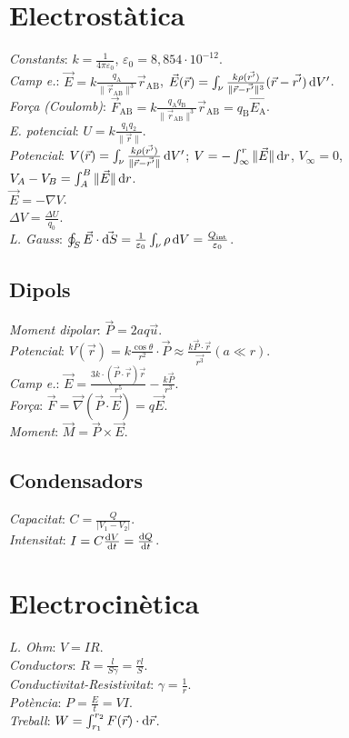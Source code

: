 \section{Electrostàtica} \emph{Constants}: $k=\frac{1}{4\pi\varepsilon_0}$, $\varepsilon_0=8,854\cdot 10^{-12}$. \\ \emph{Camp e.}: $\vec{E} = k\frac{q_\text{A}}{\|\vec{r}_{\text{AB}}\|^3}\vec{r}_{\text{AB}}$, $\vec{E}(\vec{r}) = \int_\nu \frac{k\rho(\vec{r'})}{\|\vec{r}-\vec{r'}\|^3}(\vec{r}-\vec{r'}) \dif V'$. \\ \emph{Força (Coulomb)}: $\vec{F}_{\text{AB}} = k\frac{q_{\text{A}}q_{\text{B}}}{\|\vec{r}_{\text{AB}}\|^3}\vec{r}_{\text{AB}}=q_\text{B}\vec{E_\text{A}}$. \\ \emph{E. potencial}: $U = k\frac{q_1q_2}{\|\vec{r}\|}$. \\
\emph{Potencial}: $V(\vec{r}) = \int_\nu \frac{k\rho(\vec{r'})}{\|\vec{r}-\vec{r'}\|}\dif V'$; $V=-\int_{\infty}^r \|\vec{E}\| \dif r$, $V_{\infty}=0$, $V_A -V_B = \int_A^B \|\vec{E}\| \dif r$. \\
\ci $\vec{E}=-\nabla V$. \\
\ci $\Delta V = \frac{\Delta U}{q_0}$. \\
\emph{L. Gauss}: $\oint_S \vec{E}\cdot \vec{\dif S} = \frac{1}{\varepsilon_0} \int_\nu \rho \dif V = \frac{Q_\text{int}}{\varepsilon_0}$.

\subsection{Dipols}
\emph{Moment dipolar}: $\vec{P} = 2aq\vec{u}$. \\
\emph{Potencial}: $V(\vec{r}) = k\frac{\cos \theta}{r^2}\cdot \vec{P} \approx \frac{k\vec{P}\cdot\vec{r}}{\vec{r^3}} (a \ll r)$. \\
\emph{Camp e.}: $\vec{E} = \frac{3k\cdot (\vec{P}\cdot\vec{r})\vec{r}}{r^5} - \frac{k\vec{P}}{r^3}$. \\
\emph{Força}: $\vec{F} = \vec{\nabla}(\vec{P}\cdot \vec{E}) = q\vec{E}$. \\
\emph{Moment}: $\vec{M} = \vec{P}\times \vec{E}$.

\subsection{Condensadors}
\emph{Capacitat}: $C = \frac{Q}{|V_1-V_2|}$. \\
\emph{Intensitat}: $I=C\frac{\dif V}{\dif t} = \frac{\dif Q}{\dif t}$.

\section{Electrocinètica}
\emph{L. Ohm}: $V=IR$. \\
\emph{Conductors}: $R = \frac{l}{S\gamma} = \frac{rl}{S}$. \\
\emph{Conductivitat-Resistivitat}: $\gamma = \frac{1}{r}$. \\
\emph{Potència}: $P=\frac{E}{t}=VI$. \\
\emph{Treball}: $W=\int_{r_1}^{r_2} F(\vec{r}) \cdot \dif \vec{r}$.


